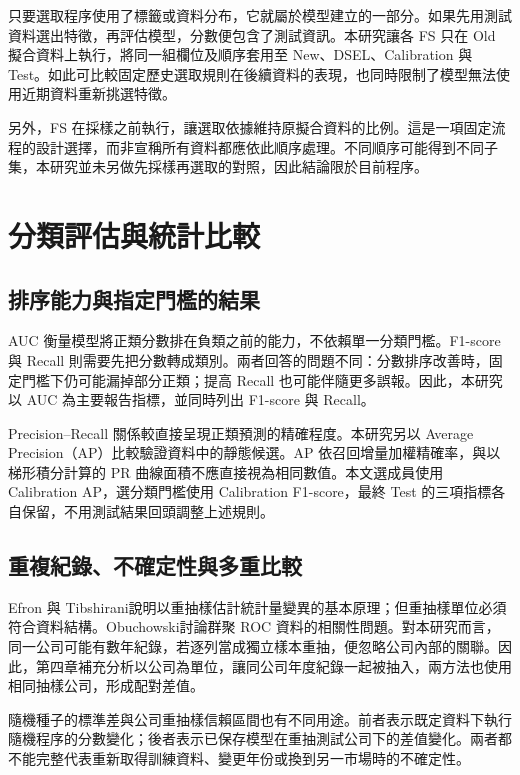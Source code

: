 只要選取程序使用了標籤或資料分布，它就屬於模型建立的一部分。如果先用測試資料選出特徵，再評估模型，分數便包含了測試資訊。本研究讓各 FS 只在 Old 擬合資料上執行，將同一組欄位及順序套用至 New、DSEL、Calibration 與 Test。如此可比較固定歷史選取規則在後續資料的表現，也同時限制了模型無法使用近期資料重新挑選特徵。

另外，FS 在採樣之前執行，讓選取依據維持原擬合資料的比例。這是一項固定流程的設計選擇，而非宣稱所有資料都應依此順序處理。不同順序可能得到不同子集，本研究並未另做先採樣再選取的對照，因此結論限於目前程序。

\section{分類評估與統計比較}

\subsection{排序能力與指定門檻的結果}

AUC 衡量模型將正類分數排在負類之前的能力，不依賴單一分類門檻。F1-score 與 Recall 則需要先把分數轉成類別。兩者回答的問題不同：分數排序改善時，固定門檻下仍可能漏掉部分正類；提高 Recall 也可能伴隨更多誤報。因此，本研究以 AUC 為主要報告指標，並同時列出 F1-score 與 Recall。

Precision--Recall 關係較直接呈現正類預測的精確程度\autocite{saito2015pr}。本研究另以 Average Precision（AP）比較驗證資料中的靜態候選。AP 依召回增量加權精確率，與以梯形積分計算的 PR 曲線面積不應直接視為相同數值\autocite{sklearn-ap-docs}。本文選成員使用 Calibration AP，選分類門檻使用 Calibration F1-score，最終 Test 的三項指標各自保留，不用測試結果回頭調整上述規則。

\subsection{重複紀錄、不確定性與多重比較}

Efron 與 Tibshirani\autocite{efron1986bootstrap}說明以重抽樣估計統計量變異的基本原理；但重抽樣單位必須符合資料結構。Obuchowski\autocite{obuchowski1997clustered}討論群聚 ROC 資料的相關性問題。對本研究而言，同一公司可能有數年紀錄，若逐列當成獨立樣本重抽，便忽略公司內部的關聯。因此，第四章補充分析以公司為單位，讓同公司年度紀錄一起被抽入，兩方法也使用相同抽樣公司，形成配對差值。

隨機種子的標準差與公司重抽樣信賴區間也有不同用途。前者表示既定資料下執行隨機程序的分數變化；後者表示已保存模型在重抽測試公司下的差值變化。兩者都不能完整代表重新取得訓練資料、變更年份或換到另一市場時的不確定性。

